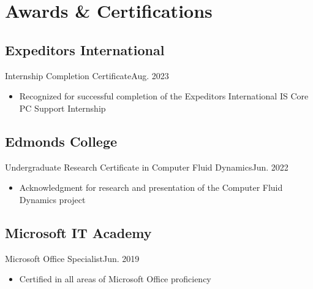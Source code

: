 \section{Awards \& Certifications}
\subsection{Expeditors International}{Internship Completion Certificate}{}{Aug. 2023}
\begin{itemize}
    \item Recognized for successful completion of the Expeditors International IS Core PC Support Internship
\end{itemize}

\subsection{Edmonds College}{Undergraduate Research Certificate in Computer Fluid Dynamics}{}{Jun. 2022}
\begin{itemize}
    \item Acknowledgment for research and presentation of the Computer Fluid Dynamics project
\end{itemize}

\subsection{Microsoft IT Academy}{Microsoft Office Specialist}{}{Jun. 2019}
\begin{itemize}
    \item Certified in all areas of Microsoft Office proficiency
\end{itemize}
